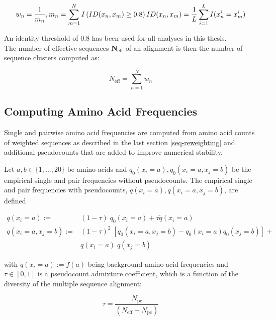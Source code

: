 \documentclass[11pt,a4paper,twoside]{book}
\newcommand{\eq}{\!=\!}
\newcommand{\neff}{N_\mathrm{eff}}
\theoremstyle{definition}
\theoremstyle{definition}
\theoremstyle{remark}
\begin{document}
\begin{equation} 
  w_n = \frac{1}{m_n}, m_n = \sum_{m=1}^N I \left( ID(x_n, x_m) \geq 0.8 \right) \\
  ID(x_n, x_m)=\frac{1}{L} \sum_{i=1}^L I(x_n^i = x_m^i)
  \label{eq:seqweight}
\end{equation}

An identity threshold of 0.8 has been used for all analyses in this
thesis.\\
The number of effective sequences \(\mathbf{\neff}\) of an alignment is
then the number of sequence clusters computed as:

\begin{equation} 
  \neff = \sum_{n=1}^N w_n
  \label{eq:neff}
\end{equation}

\subsection{Computing Amino Acid
Frequencies}\label{amino-acid-frequencies}

Single and pairwise amino acid frequencies are computed from amino acid
counts of weighted sequences as described in the last section
\ref{seq-reweighting} and additional pseudocounts that are added to
improve numerical stability.

Let \(a,b \in \{1,\ldots,20\}\) be amino acids and
\(q_0(x_i=a), q_0(x_i=a,x_j=b)\) be the empirical single and pair
frequencies without pseudocounts. The empirical single and pair
frequencies with pseudocounts, \(q(x_i=a), q(x_i=a, x_j=b)\), are
defined

\begin{align}
    q(x_i \eq a) :=& (1-\tau) \;  q_0(x_i \eq a) + \tau \tilde{q}(x_i\eq a) \\
    q(x_i \eq a, x_j \eq b) :=& (1-\tau)^2  \; [ q_0(x_i \eq a, x_j \eq b) - q_0(x_i \eq a)  q_0(x_j \eq b) ] + \nonumber\\
                            & q(x_i \eq a) \; q(x_j \eq b) 
\label{eq:pseudocounts}
\end{align}

with \(\tilde{q}(x_i \eq a) := f(a)\) being background amino acid
frequencies and \(\tau \in [0,1]\) is a pseudocount admixture
coefficient, which is a function of the diversity of the multiple
sequence alignment:

\begin{equation}
    \tau = \frac{N_\mathrm{pc}}{(N_\mathrm{eff} + N_\mathrm{pc})}
\label{eq:tau}
\end{equation}
\end{document}
